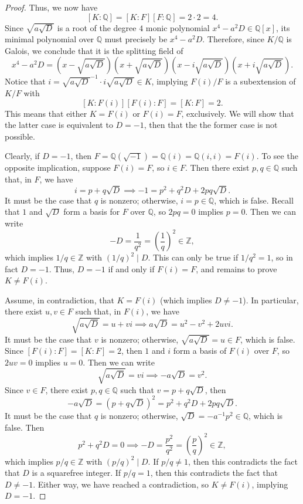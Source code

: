 \documentclass[12pt]{article}
\newcommand{\Z}{\mathbb{Z}}
\newcommand{\Q}{\mathbb{Q}}
\newcommand{\<}{\langle}
\renewcommand{\>}{\rangle}
\newcommand{\tsqrt}[1]{{\textstyle\sqrt{#1}}}
\newcommand{\pfrac}[2]{\left(\frac{#1}{#2}\right)}
\begin{document}
\begin{proof}
    Thus, we now have
    \[
        [K : \Q]
            = [K : F][F : \Q]
            = 2 \cdot 2
            = 4.
    \]
    Since $\sqrt{a\sqrt{D}}$ is a root of the degree $4$ monic polynomial $x^4 - a^2D \in \Q[x]$, its minimal polynomial over $\Q$ must precisely be $x^4 - a^2D$. Therefore, since $K/\Q$ is Galois, we conclude that it is the splitting field of
    \[
        x^4 - a^2D
            = \left(x - \tsqrt{a\sqrt{D}}\right)
                \left(x + \tsqrt{a\sqrt{D}}\right)
                \left(x - i\tsqrt{a\sqrt{D}}\right)
                \left(x + i\tsqrt{a\sqrt{D}}\right).
    \]
    Notice that $i = \sqrt{a\sqrt{D}}^{-1} \cdot i\sqrt{a\sqrt{D}} \in K$, implying $F(i)/F$ is a subextension of $K/F$ with
    \[
        [K : F(i)][F(i) : F] = [K : F] = 2.
    \]
    This means that either $K = F(i)$ or $F(i) = F$, exclusively. We will show that the latter case is equivalent to $D = -1$, then that the the former case is not possible.

    Clearly, if $D = -1$, then $F = \Q(\sqrt{-1}) = \Q(i) = \Q(i, i) = F(i)$. To see the opposite implication, suppose $F(i) = F$, so $i \in F$. Then there exist $p, q \in \Q$ such that, in $F$, we have
    \[
        i = p + q\sqrt{D} \implies -1 = p^2 + q^2D + 2pq\sqrt{D}.
    \]
    It must be the case that $q$ is nonzero; otherwise, $i = p \in \Q$, which is false. Recall that $1$ and $\sqrt{D}$ form a basis for $F$ over $\Q$, so $2pq = 0$ implies $p = 0$. Then we can write
    \[
        -D = \frac{1}{q^2} = \pfrac{1}{q}^2 \in \Z,
    \]
    which implies $1/q \in \Z$ with $(1/q)^2 \mid D$. This can only be true if $1/q^2 = 1$, so in fact $D = -1$. Thus, $D = -1$ if and only if $F(i) = F$, and remains to prove $K \ne F(i)$.

    Assume, in contradiction, that $K = F(i)$ (which implies $D \ne -1$). In particular, there exist $u, v \in F$ such that, in $F(i)$, we have
    \[
        \tsqrt{a\sqrt{D}} = u + vi \implies a\sqrt{D} = u^2 - v^2 + 2uvi.
    \]
    It must be the case that $v$ is nonzero; otherwise, $\sqrt{a\sqrt{D}} = u \in F$, which is false.
    Since $[F(i) : F] = [K : F] = 2$, then $1$ and $i$ form a basis of $F(i)$ over $F$, so $2uv = 0$ implies $u = 0$. Then we can write
    \[
        \tsqrt{a\sqrt{D}} = vi \implies -a\sqrt{D} = v^2.
    \]
    Since $v \in F$, there exist $p, q \in \Q$ such that $v = p + q\sqrt{D}$, then
    \[
        -a\tsqrt{D} = (p + q\sqrt{D})^2 = p^2 + q^2D + 2pq\sqrt{D}.
    \]
    It must be the case that $q$ is nonzero; otherwise, $\sqrt{D} = -a^{-1}p^2 \in \Q$, which is false. Then
    \[
        p^2 + q^2D = 0 \implies -D = \frac{p^2}{q^2} = \pfrac{p}{q}^2 \in \Z,
    \]
    which implies $p/q \in \Z$ with $(p/q)^2 \mid D$. If $p/q \ne 1$, then this contradicts the fact that $D$ is a squarefree integer. If $p/q = 1$, then this contradicts the fact that $D \ne -1$. Either way, we have reached a contradiction, so $K \ne F(i)$, implying $D = -1$.

\end{proof}
    
\end{document}
